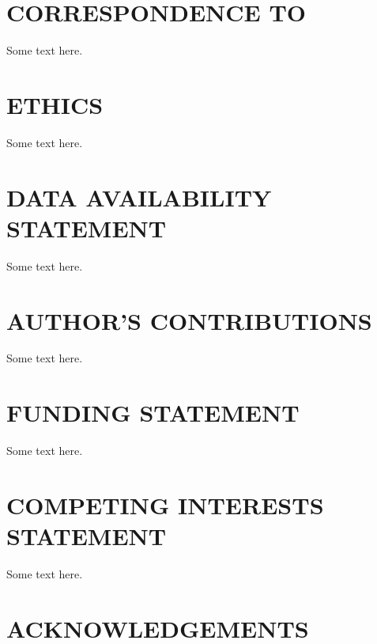\section*{CORRESPONDENCE TO}
Some text here. 
\section*{ETHICS}
Some text here. 
\section*{DATA AVAILABILITY STATEMENT}
Some text here. 
\section*{AUTHOR'S CONTRIBUTIONS}
Some text here. 
\section*{FUNDING STATEMENT}
 Some text here. 
\section*{COMPETING INTERESTS STATEMENT}
Some text here. 
\section*{ACKNOWLEDGEMENTS}
